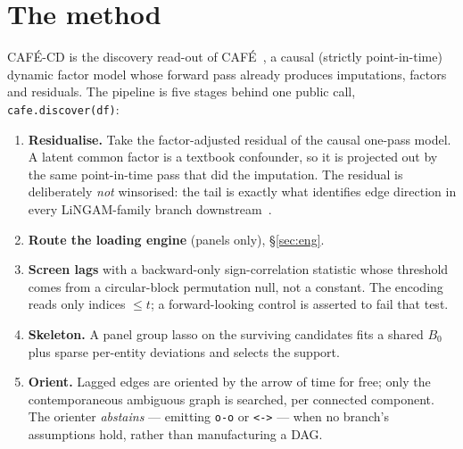\documentclass[10pt,twocolumn]{article}
\newcommand{\cafe}{CAF\'E}
\DeclareRobustCommand{\cd}{\cafe{}\nobreakdash-CD}
\begin{document}
\begin{abstract}
falsified, and are reported.
\textbf{(3)~Benchmark forensics.} We reproduce five published CausalRivers cells, then
show the same VAR moves $0.849\to0.593$ on all 2\,139 subgraphs by switching to a
scale-free statistic; the true graphs have var-sortability $0.939$. We reproduce the
CausalDynamics \texttt{coupled} leaderboard from the authors' own shipped artefacts, and
then find that a \emph{constant identity matrix} scores $0.682/0.353$ there and no
shipped method beats it. Two \texttt{simple} cells are broken and we reproduce both
published AUROCs to $10^{-3}$ by replicating the defect; a third defect feeds an
endpoint matrix to a ranking metric.
\textbf{(4)~A point-in-time board}, now complete: every published method is batch, and
churn and a leakage delta on each method's own metric say what that costs.
\textbf{(5)~Runtime}: $\RTspeed\times$ faster than PCMCI$+$ on a real 12-variable
series at the same dense submission. Limitations get their own section.
\end{abstract}

\section{The method}\label{sec:method}
\cd{} is the discovery read-out of \cafe{}~\cite{cafe}, a causal (strictly
point-in-time) dynamic factor model whose forward pass already produces imputations,
factors and residuals. The pipeline is five stages behind one public call,
\texttt{cafe.discover(df)}:

\begin{enumerate}
\item \textbf{Residualise.} Take the factor-adjusted residual of the causal one-pass
  model. A latent common factor is a textbook confounder, so it is projected out by the
  same point-in-time pass that did the imputation. The residual is deliberately
  \emph{not} winsorised: the tail is exactly what identifies edge direction in every
  LiNGAM-family branch downstream~\cite{shimizu2006,hyvarinen2010}.
\item \textbf{Route the loading engine} (panels only), \S\ref{sec:eng}.
\item \textbf{Screen lags} with a backward-only sign-correlation statistic whose
  threshold comes from a circular-block permutation null, not a constant. The encoding
  reads only indices $\le t$; a forward-looking control is asserted to fail that test.
\item \textbf{Skeleton.} A panel group lasso on the surviving candidates fits a shared
  $B_0$ plus sparse per-entity deviations and selects the support.
\item \textbf{Orient.} Lagged edges are oriented by the arrow of time for free; only
  the contemporaneous ambiguous graph is searched, per connected component. The
  orienter \emph{abstains} --- emitting \texttt{o-o} or \texttt{<->} --- when no
  branch's assumptions hold, rather than manufacturing a DAG.
\end{enumerate}
\end{document}
